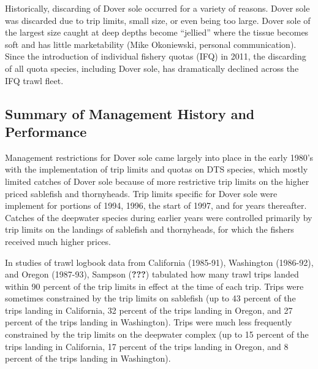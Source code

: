 \documentclass[11pt,
  english,
  a4paper,
]{article}
\begin{document}
Historically, discarding of Dover sole occurred for a variety of reasons. Dover sole was discarded due to trip limits, small size, or even being too large. Dover sole of the largest size caught at deep depths become ``jellied'' where the tissue becomes soft and has little marketability (Mike Okoniewski, personal communication). Since the introduction of individual fishery quotas (IFQ) in 2011, the discarding of all quota species, including Dover sole, has dramatically declined across the IFQ trawl fleet.

\leavevmode\tagmcend\tagstructend\par


\hypertarget{summary-of-management-history-and-performance}{%
\subsection{Summary of Management History and Performance}\label{summary-of-management-history-and-performance}}

\leavevmode\tagmcend\tagstructend


Management restrictions for Dover sole came largely into place in the early 1980's with the implementation of trip limits and quotas on DTS species, which mostly limited catches of Dover sole because of more restrictive trip limits on the higher priced sablefish and thornyheads. Trip limits specific for Dover sole were implement for portions of 1994, 1996, the start of 1997, and for years thereafter. Catches of the deepwater species during earlier years were controlled primarily by trip limits on the landings of sablefish and thornyheads, for which the fishers received much higher prices.

\leavevmode\tagmcend\tagstructend\par


In studies of trawl logbook data from California (1985-91), Washington (1986-92), and Oregon (1987-93), Sampson {({\textbf{???}})\leavevmode\tagmcend\tagstructend} tabulated how many trawl trips landed within 90 percent of the trip limits in effect at the time of each trip. Trips were sometimes constrained by the trip limits on sablefish (up to 43 percent of the trips landing in California, 32 percent of the trips landing in Oregon, and 27 percent of the trips landing in Washington). Trips were much less frequently constrained by the trip limits on the deepwater complex (up to 15 percent of the trips landing in California, 17 percent of the trips landing in Oregon, and 8 percent of the trips landing in Washington).
\end{document}
